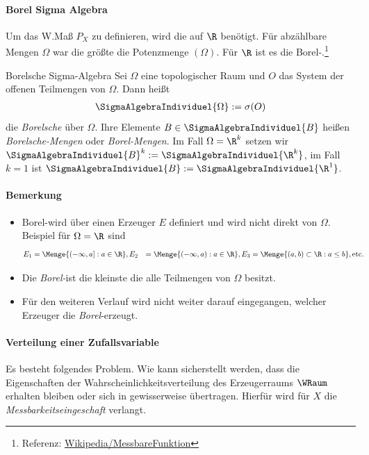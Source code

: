 \paragraph{Borel Sigma Algebra}
Um das \gls{W.}Maß $P_X$ zu definieren, wird die \SigmaAlgebraText auf $\R$ benötigt. Für abzählbare Mengen $\Omega$ war die größte \SigmaAlgebraText die Potenzmenge \Potenzmenge$(\Omega)$. Für $\R$ ist es die Borel-\SigmaAlgebraText.\footnote{Referenz: \href{https://de.wikipedia.org/wiki/Messbare{\_}Funktion}{Wikipedia/MessbareFunktion}}
\begin{Definition}{Borelsche Sigma-Algebra}
	Sei $\Omega$ eine topologischer Raum und $O$ das System der offenen Teilmengen von $\Omega$. Dann heißt
	\begin{align}
		\SigmaAlgebraIndividuel{\Omega} := \sigma(O)
	\end{align}
	die \textit{Borelsche} \SigmaAlgebraText über $\Omega$. Ihre Elemente $B\in\SigmaAlgebraIndividuel{B}$ heißen \textit{Borelsche-Mengen} oder \textit{Borel-Mengen}. Im Fall $\Omega=\R^k$ setzen wir $\SigmaAlgebraIndividuel{B}^k:=\SigmaAlgebraIndividuel{\R^k}$, im Fall $k=1$ ist $\SigmaAlgebraIndividuel{B}:=\SigmaAlgebraIndividuel{\R^1}$.
\end{Definition}

\paragraph{Bemerkung}
\begin{itemize}
	\item Borel-\SigmaAlgebraText wird über einen Erzeuger $E$ definiert und wird nicht direkt von $\Omega$. Beispiel für $\Omega=\R$ sind
	\begin{align*}
		E_1 & = \Menge{(-\infty, a]: a\in \R},
		E_2 & = \Menge{(-\infty, a): a\in \R},
		E_3 & = \Menge{(a, b) \subset \R:  a \leq b}, \text{etc.}
	\end{align*}
	\item Die \textit{Borel-}\SigmaAlgebraText ist die kleinste \SigmaAlgebraText die alle Teilmengen von $\Omega$ besitzt.
	\item Für den weiteren Verlauf wird nicht weiter darauf eingegangen, welcher Erzeuger die \textit{Borel}-\SigmaAlgebraText erzeugt.
\end{itemize}

\paragraph{Verteilung einer Zufallsvariable}
Es besteht folgendes Problem. Wie kann sicherstellt werden, dass die Eigenschaften der Wahrscheinlichkeitsverteilung des Erzeugerraums $\WRaum$ erhalten bleiben oder sich in gewisserweise übertragen. Hierfür wird für $X$ die \textit{Messbarkeitseingeschaft} verlangt. \\

